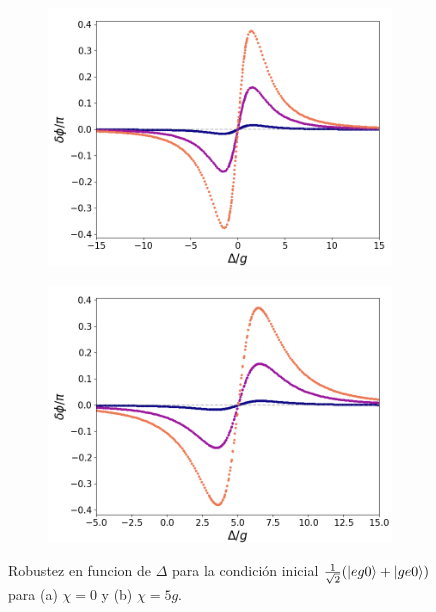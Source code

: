 \begin{figure}[h]
    \centering
    \begin{subfigure}{0.49\textwidth}
        \includegraphics[width=\textwidth]{figuras/ch5/robustez/delta/eg0+ge0 k=0.0g x=0.0g J=0.0g.png}
        \caption{}
        \label{fig5:robustez detunning 1 eg0}
    \end{subfigure}
    \hfill
    \begin{subfigure}{0.49\textwidth}
        \includegraphics[width=\textwidth]{figuras/ch5/robustez/delta/eg0+ge0 k=0.0g x=5.0g J=0.0g.png}
        \caption{}
        \label{fig5:robustez detunning 2 eg0}
    \end{subfigure}
    \vfill

    \caption{Robustez en funcion de $\Delta$ para la condición inicial $\frac{1}{\sqrt{2}}(\ket{eg0}+\ket{ge0})$ para (a) $\chi=0$ y (b) $\chi=5g$.}
    \label{fig5:robustez detunning eg0}
\end{figure}

